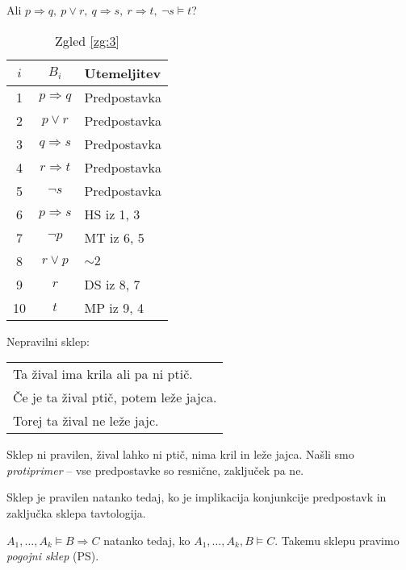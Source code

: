 \documentclass[12pt, a4paper]{article}
\renewcommand{\implies}{\Rightarrow}
\begin{document}
\begin{zgled}\label{zg:3}
Ali $p\implies q,~p\lor r,~q\implies s,~r\implies t,~\neg s\models t$?
\begin{table}[H]
\centering
\begin{tabular}{c|c|l}
$i$ & $B_i$ & Utemeljitev \\
\hline
1 & $p\implies q$  & Predpostavka \\
2 & $p\lor r$      & Predpostavka \\
3 & $q\implies s $ & Predpostavka \\
4 & $r\implies t$  & Predpostavka \\
5 & $\neg s$       & Predpostavka \\
6 & $p\implies s$  & HS iz 1, 3 \\
7 & $\neg p$       & MT iz 6, 5 \\
8 & $r\lor p$      & $\sim 2$ \\
9 & $r$            & DS iz 8, 7 \\
10 & $t$           & MP iz 9, 4 \\
\end{tabular} 
\caption{Zgled \ref{zg:3}}
\end{table}
\end{zgled}

\begin{zgled}
Nepravilni sklep:

\begin{center}
\begin{tabular}{l}
Ta žival ima krila ali pa ni ptič.\\
Če je ta žival ptič, potem leže jajca.\\
\hline
Torej ta žival ne leže jajc.
\end{tabular}
\end{center}

Sklep ni pravilen, žival lahko ni ptič, nima kril in leže jajca. Našli smo \emph{protiprimer} -- vse predpostavke so resnične, zaključek pa ne.
\end{zgled}

\begin{izrek}\label{iz:1}
Sklep je pravilen natanko tedaj, ko je implikacija konjunkcije predpostavk in zaključka sklepa tavtologija.
\end{izrek}

\obvs

\begin{izrek}
$A_1,\dots,A_k\models B\implies C$ natanko tedaj, ko $A_1,\dots,A_k,B\models C$. Takemu sklepu pravimo \emph{pogojni sklep} (PS).
\end{izrek}
\end{document}
